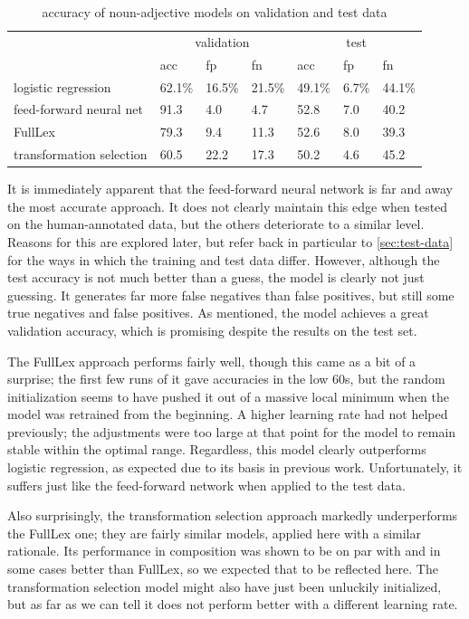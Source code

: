 \documentclass[a4paper, 12pt]{article}
\begin{document}
\begin{table}[]
	\centering
	\begin{tabular}{l|lll|lll}
		                         & \multicolumn{3}{c|}{validation} & \multicolumn{3}{c}{test}  \\
		                         & acc      & fp       & fn        & acc     & fp     & fn     \\ \hline
		logistic regression      & 62.1\%   & 16.5\%   & 21.5\%    & 49.1\%  & 6.7\%  & 44.1\% \\
		feed-forward neural net  & 91.3     & 4.0      & 4.7       & 52.8    & 7.0    & 40.2   \\
		FullLex                  & 79.3     & 9.4      & 11.3      & 52.6    & 8.0    & 39.3   \\
		transformation selection & 60.5     & 22.2     & 17.3      & 50.2    & 4.6    & 45.2
	\end{tabular}
	\caption{accuracy of noun-adjective models on validation and test data}
	\label{accuracy-an}
\end{table}

It is immediately apparent that the feed-forward neural network is far and away the most accurate approach. It does not clearly maintain this edge when tested on the human-annotated data, but the others deteriorate to a similar level. Reasons for this are explored later, but refer back in particular to \ref{sec:test-data} for the ways in which the training and test data differ. However, although the test accuracy is not much better than a guess, the model is clearly not just guessing. It generates far more false negatives than false positives, but still some true negatives and false positives. As mentioned, the model achieves a great validation accuracy, which is promising despite the results on the test set.

The FullLex approach performs fairly well, though this came as a bit of a surprise; the first few runs of it gave accuracies in the low 60s, but the random initialization seems to have pushed it out of a massive local minimum when the model was retrained from the beginning. A higher learning rate had not helped previously; the adjustments were too large at that point for the model to remain stable within the optimal range. Regardless, this model clearly outperforms logistic regression, as expected due to its basis in previous work. Unfortunately, it suffers just like the feed-forward network when applied to the test data.

Also surprisingly, the transformation selection approach markedly underperforms the FullLex one; they are fairly similar models, applied here with a similar rationale. Its performance in composition was shown to be on par with and in some cases better than FullLex, so we expected that to be reflected here. The transformation selection model might also have just been unluckily initialized, but as far as we can tell it does not perform better with a different learning rate.
\end{document}
